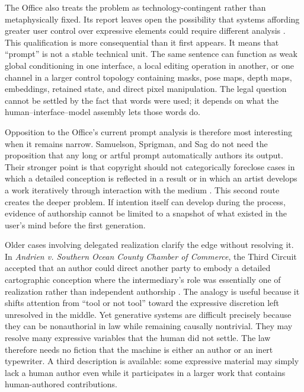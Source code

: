 \documentclass[11pt]{article}
\begin{document}
The Office also treats the problem as technology-contingent rather than metaphysically fixed. Its report leaves open the possibility that systems affording greater user control over expressive elements could require different analysis \citep{USCO2025Copyrightability}. This qualification is more consequential than it first appears. It means that ``prompt'' is not a stable technical unit. The same sentence can function as weak global conditioning in one interface, a local editing operation in another, or one channel in a larger control topology containing masks, pose maps, depth maps, embeddings, retained state, and direct pixel manipulation. The legal question cannot be settled by the fact that words were used; it depends on what the human--interface--model assembly lets those words do.

Opposition to the Office's current prompt analysis is therefore most interesting when it remains narrow. Samuelson, Sprigman, and Sag do not need the proposition that any long or artful prompt automatically authors its output. Their stronger point is that copyright should not categorically foreclose cases in which a detailed conception is reflected in a result or in which an artist develops a work iteratively through interaction with the medium \citep{SamuelsonSprigmanSag2023Comments}. This second route creates the deeper problem. If intention itself can develop during the process, evidence of authorship cannot be limited to a snapshot of what existed in the user's mind before the first generation.

Older cases involving delegated realization clarify the edge without resolving it. In \emph{Andrien v. Southern Ocean County Chamber of Commerce}, the Third Circuit accepted that an author could direct another party to embody a detailed cartographic conception where the intermediary's role was essentially one of realization rather than independent authorship \citep{Andrien1991}. The analogy is useful because it shifts attention from ``tool or not tool'' toward the expressive discretion left unresolved in the middle. Yet generative systems are difficult precisely because they can be nonauthorial in law while remaining causally nontrivial. They may resolve many expressive variables that the human did not settle. The law therefore needs no fiction that the machine is either an author or an inert typewriter. A third description is available: some expressive material may simply lack a human author even while it participates in a larger work that contains human-authored contributions.
\end{document}
